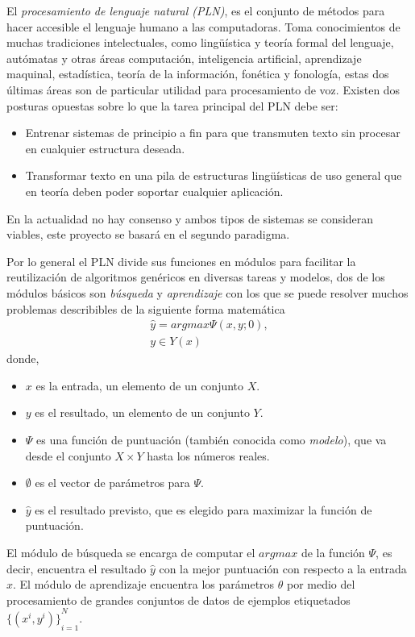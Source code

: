 El \emph{procesamiento de lenguaje natural (PLN)}, es el conjunto de métodos para hacer accesible el lenguaje humano a las computadoras\cite{eise19}. Toma conocimientos de muchas tradiciones intelectuales, como lingüística y teoría formal del lenguaje, autómatas y otras áreas computación, inteligencia artificial, aprendizaje maquinal, estadística, teoría de la información, fonética y fonología, estas dos últimas áreas son de particular utilidad para procesamiento de voz. Existen dos posturas opuestas sobre lo que la tarea principal del PLN debe ser:
\begin{itemize}
	\item Entrenar sistemas de principio a fin para que transmuten texto sin procesar en cualquier estructura deseada.
	\item Transformar texto en una pila de estructuras lingüísticas de uso general que en teoría deben poder soportar cualquier aplicación.
\end{itemize}
En la actualidad no hay consenso y ambos tipos de sistemas se consideran viables, este proyecto se basará en el segundo paradigma. 

Por lo general el PLN divide sus funciones en módulos para facilitar la reutilización de algoritmos genéricos en diversas tareas y modelos, dos de los módulos básicos son \emph{búsqueda} y \emph{aprendizaje} con los que se puede resolver muchos problemas describibles de la siguiente forma matemática
\begin{equation}
\begin{matrix}
\hat{y}=argmax\Psi(x,y;0),\\
y\in Y(x)
\end{matrix}
\end{equation}
donde,
\begin{itemize}
	\item $x$ es la entrada, un elemento de un conjunto $X$.
	\item $y$ es el resultado, un elemento de un conjunto $Y$.
	\item $\Psi$ es una función de puntuación (también conocida como \emph{modelo}), que va desde el conjunto $X\times Y$ hasta los números reales.
	\item $\emptyset$ es el vector de parámetros para $\Psi$.
	\item $\hat{y}$ es el resultado previsto, que es elegido para maximizar la función de puntuación.
\end{itemize}
El módulo de búsqueda se encarga de computar el $argmax$ de la función $\Psi$, es decir, encuentra el resultado $\hat{y}$ con la mejor puntuación con respecto a la entrada $x$. El módulo de aprendizaje encuentra los parámetros $\theta$ por medio del procesamiento de grandes conjuntos de datos de ejemplos etiquetados ${\{(x^i,y^i)\}}_{i=1}^{N}$.